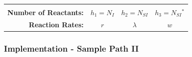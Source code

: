 \documentclass{beamer}
\begin{document}
\begin{frame}
{\begin{tabular}{rccc}
\begin{minipage}{.3\textwidth}
    \end{minipage} 
\\
 \textbf{Number of Reactants:} & $h_1=N_I$ & $h_2=N_{SI}$& $h_3=N_{SI}$${}^{\!\!\!\!\!\!*}$\\
\rule{0pt}{4ex}  
 \textbf{Reaction Rates:} & $r$  & $\lambda$  &  $w$ %
\end{tabular}
}
\end{frame}


\begin{frame}
 \frametitle{Implementation - Sample Path II}
\centering
{}
\end{frame}
\end{document}
